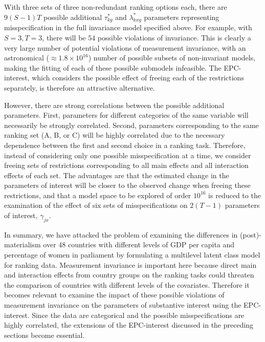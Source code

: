 \documentclass[letterpaper,12pt]{article}
\begin{document}
With three sets of three non-redundant ranking options each, there are $9 (S - 1) T$ possible additional $\tau^{*}_{k g}$ and $\lambda^{*}_{k x g}$ parameters representing misspecification in the full invariance model specified above. For example, with $S=3, T=3$, there will be $54$ possible violations of invariance. %
This is clearly a very large number of potential violations of measurement invariance, with an astronomical ($\approx 1.8 \times 10^{16}$) number of possible subsets of non-invariant models, making the fitting of each of these possible submodels infeasible. The EPC-interest, which considers the possible effect of freeing each of the restrictions separately, is therefore an attractive alternative. 

However, there are strong correlations between the possible additional parameters. First, parameters for different categories of the same variable will necessarily be strongly correlated. Second, parameters corresponding to the same ranking set (A, B, or C) will be highly correlated due to the necessary dependence between the first and second choice in a ranking task. Therefore, instead of considering only one possible misspecification at a time, we consider freeing sets of restrictions corresponding to all main effects and all interaction effects of each set. The advantages are that the estimated change in the parameters of interest will be closer to the observed change when freeing these restrictions, and that a model space to be explored of order $10^{16}$ is reduced to the examination of the effect of six sets of misspecifications on $2 (T-1)$  parameters of interest, $\gamma_{jx}$.

\bigskip
In summary, we have attacked the problem of examining the differences in (post)-materialism over 48 countries with different levels of GDP per capita and percentage of women in parliament by formulating a multilevel latent class model for ranking data. Measurement invariance is important here because direct main and interaction effects from country groups on the ranking tasks could threaten the comparison of countries with different levels of the covariates. Therefore it becomes relevant to examine the impact of these possible violations of measurement invariance on the parameters of substantive interest using the EPC-interest. Since the data are categorical and the possible misspecifications are highly correlated, the extensions of the EPC-interest discussed in the preceding sections become essential.
\end{document}
